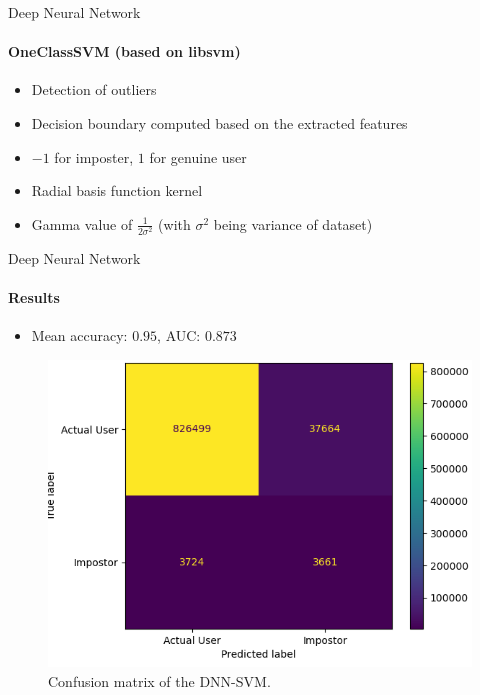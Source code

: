 \documentclass{beamer}
\begin{document}
\begin{frame}{Deep Neural Network}
\framesubtitle{OneClassSVM (based on libsvm)}
    \begin{itemize}
        \item Detection of outliers
        \item Decision boundary computed based on the extracted features
        \item $-1$ for imposter, $1$ for genuine user
        \item Radial basis function kernel
        \item Gamma value of $\frac{1}{2\sigma^2}$ (with $\sigma^2$ being variance of dataset)
    \end{itemize}
\end{frame}

\begin{frame}{Deep Neural Network}
\framesubtitle{Results}
\begin{itemize}
    \item Mean accuracy: $0.95$, AUC: $0.873$
\end{itemize}
\begin{varwidth}{0.5\textwidth}
\begin{figure}
    \centering
    \includegraphics[width=.9\textwidth]{theme/images/cnn_confusion_matrix.png}
    \caption{Confusion matrix of the DNN-SVM.}
    \label{fig:confusion_matrix_svm_cnn}
\end{figure}
\end{varwidth}
\begin{varwidth}{0.5\textwidth}
\begin{figure}
    \centering

\end{figure}
\end{varwidth}
\end{frame}
\end{document}
